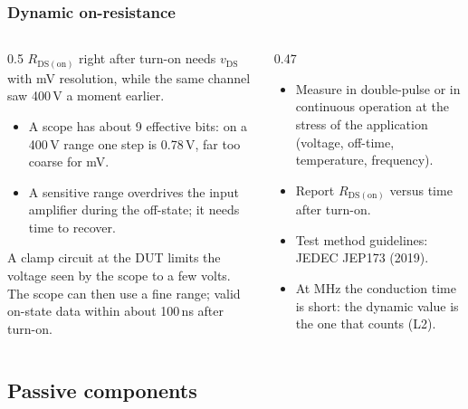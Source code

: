 \begin{frame}
	\frametitle{Dynamic on-resistance}
	\begin{columns}[T]
		\begin{column}{0.5\textwidth}
			\small
			$R_\mathrm{DS(on)}$ right after turn-on needs $v_\mathrm{DS}$ with mV resolution, while the same channel saw 400\,V a moment earlier.
			\begin{itemize}
				\item A scope has about 9 effective bits: on a 400\,V range one step is 0.78\,V, far too coarse for mV.
				\item A sensitive range overdrives the input amplifier during the off-state; it needs time to recover.
			\end{itemize}
			A clamp circuit at the DUT limits the voltage seen by the scope to a few volts. The scope can then use a fine range; valid on-state data within about 100\,ns after turn-on.
		\end{column}
		\begin{column}{0.47\textwidth}
			\small
			\begin{itemize}
				\item Measure in double-pulse or in continuous operation at the stress of the application (voltage, off-time, temperature, frequency).
				\item Report $R_\mathrm{DS(on)}$ versus time after turn-on.
				\item Test method guidelines: JEDEC JEP173 (2019).
				\item At MHz the conduction time is short: the dynamic value is the one that counts (L2).
			\end{itemize}
		\end{column}
	\end{columns}
\end{frame}

\subsection{Passive components}

